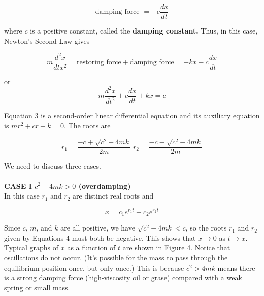 \documentclass[12pt]{article}
\begin{document}
      \begin{equation*}
        \text{damping force } = -c\frac{dx}{dt}
      \end{equation*}

      where $c$ is a positive constant, called the \textbf{damping constant.} Thus, in this
      case, Newton's Second Law gives 

      \begin{equation*}
        m\frac{d^2x}{dtx^2} = \text{restoring force} + \text{damping force} = -kx - c\frac{dx}{dt}
      \end{equation*}

      or 
      \begin{equation}
        \boxed
        {
          m\frac{d^2x}{dt^2} + c\frac{dx}{dt} + kx = c
        }
      \end{equation}

      Equation 3 is a second-order linear differential equation and its auxiliary equation
      is $mr^2 + cr + k = 0$. The roots are 

      \begin{equation}
        r_1 = \frac{-c + \sqrt{c^2 - 4mk}}{2m} \; r_2 = \frac{-c - \sqrt{c^2 - 4mk}}{2m}
      \end{equation}

     We need to discuss three cases. \\ \\

     \textbf{CASE I $c^2 - 4mk > 0 $ (overdamping)} \\

     In this case $r_1$ and $r_2$ are distinct real roots and 
      
     \begin{equation*}
      x = c_1e^{r_1t} + c_2e^{r_2t}
     \end{equation*}

      Since $c$, $m$, and $k$ are all positive, we have $\sqrt{c^2 - 4mk} < c$, so the roots
      $r_1$ and $r_2$ given by Equations 4 must both be negative. This shows that $x
      \rightarrow 0$ as $t \rightarrow x$. Typical graphs of $x$ as a function of $t$ are shown
      in Figure 4. Notice that oscillations do not occur. (It's possible for the mass to pass
          through the equilibrium position once, but only once.) This is because $c^2 > 4mk$
      means there is a strong damping force (high-viscosity oil or grase) compared with a
      weak spring or small mass. \\
\end{document}
